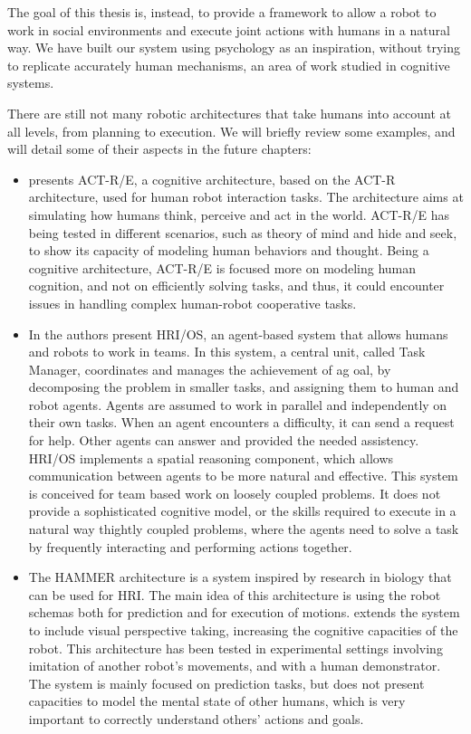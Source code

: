 The goal of this thesis is, instead, to provide a framework to allow a robot to work in social environments and execute joint actions with humans in a natural way. We have built our system using psychology as an inspiration, without trying to replicate accurately human mechanisms, an area of work studied in cognitive systems. 

There are still not many robotic architectures that take humans into account at all levels, from planning to execution. We will briefly review some examples, and will detail some of their aspects in the future chapters:
\begin{itemize} 
\item \cite{trafton2013act} presents ACT-R/E, a cognitive architecture, based
on the ACT-R architecture, used for human robot interaction tasks. The
architecture aims at simulating how humans think, perceive and act in
the world. ACT-R/E has being tested in different scenarios, such as
theory of mind and hide and seek, to show its capacity of modeling
human behaviors and thought. Being a cognitive architecture, ACT-R/E is focused more on modeling human 
cognition, and not on efficiently solving tasks, and thus, it could encounter issues in handling complex human-robot cooperative tasks. 


\item In \cite{Fong_2006} the authors present  HRI/OS, an agent-based system
that allows humans and robots to work in teams. In this system, a central unit, called Task Manager, coordinates and manages the achievement of ag oal, by decomposing the problem in smaller tasks, and assigning them to human and robot agents. Agents are assumed to work in parallel and independently on their own tasks. When an agent encounters a difficulty, it can send a request for help. Other agents can answer and provided the needed assistency. HRI/OS implements a spatial reasoning component, which allows communication between agents to be more natural and effective. This system is conceived for team based work on loosely coupled problems. It does not provide a sophisticated cognitive model, or the skills required to execute in a natural way thightly coupled problems, where the agents need to solve a task by frequently interacting and performing actions together. 


\item  The HAMMER architecture \cite{demiris2003distributed} is a system inspired by
research in biology that can be used for HRI. The main idea of this architecture is
using the robot schemas both for prediction and for execution of motions. \cite{johnson2005perceptual} extends the system to include visual perspective taking, increasing the cognitive capacities of the robot.  This architecture has been tested in experimental settings involving imitation of another robot's movements, and with a human demonstrator.  The system is mainly focused on prediction tasks, but does not present capacities to model the mental state of other humans, which is very important to correctly understand others' actions and goals.


\end{itemize}
